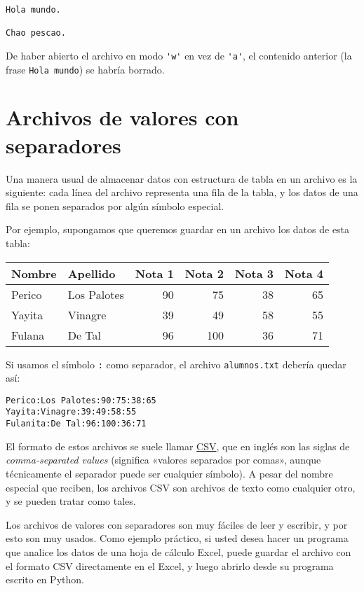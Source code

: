 \begin{lstlisting}[language=file]
Hola mundo.

Chao pescao.
\end{lstlisting}

De haber abierto el archivo en modo \lstinline!'w'! en vez de
\lstinline!'a'!, el contenido anterior (la frase \lstinline!Hola mundo!)
se habría borrado.

\section{Archivos de valores con separadores}

Una manera usual de almacenar datos con estructura de tabla en un
archivo es la siguiente: cada línea del archivo representa una fila de
la tabla, y los datos de una fila se ponen separados por algún símbolo
especial.

Por ejemplo, supongamos que queremos guardar en un archivo los datos de
esta tabla:

\begin{tabular}{llrrrr}
  \toprule
    Nombre & Apellido & Nota 1 & Nota 2 & Nota 3 & Nota 4 \\
  \midrule
    Perico & Los Palotes & 90 & 75 & 38 & 65 \\
    Yayita & Vinagre & 39 & 49 & 58 & 55 \\
    Fulana & De Tal & 96 & 100 & 36 & 71 \\
  \bottomrule
\end{tabular}

Si usamos el símbolo \lstinline!:! como separador, el archivo
\texttt{alumnos.txt} debería quedar así:

\begin{lstlisting}[language=file]
Perico:Los Palotes:90:75:38:65
Yayita:Vinagre:39:49:58:55
Fulanita:De Tal:96:100:36:71
\end{lstlisting}

El formato de estos archivos se suele llamar
\href{http://en.wikipedia.org/wiki/CSV\_(file\_format)}{CSV}, que en
inglés son las siglas de \emph{comma-separated values} (significa
«valores separados por comas», aunque técnicamente el separador puede
ser cualquier símbolo). A pesar del nombre especial que reciben, los
archivos CSV son archivos de texto como cualquier otro, y se pueden
tratar como tales.

Los archivos de valores con separadores son muy fáciles de leer y
escribir, y por esto son muy usados. Como ejemplo práctico, si usted
desea hacer un programa que analice los datos de una hoja de cálculo
Excel, puede guardar el archivo con el formato CSV directamente en el
Excel, y luego abrirlo desde su programa escrito en Python.

